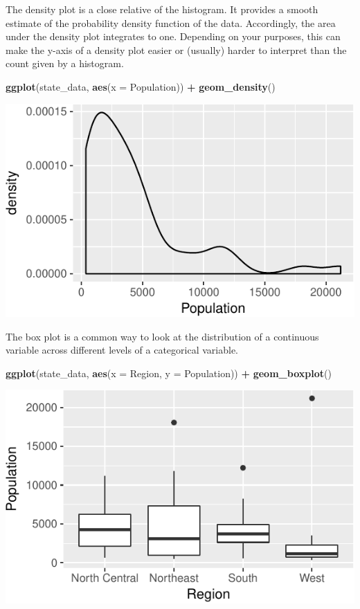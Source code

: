 \documentclass[
  12pt,
  oneside,openany]{book}
\newenvironment{Shaded}{\begin{snugshade}}{\end{snugshade}}
\newcommand{\DataTypeTok}[1]{\textcolor[rgb]{0.13,0.29,0.53}{#1}}
\newcommand{\KeywordTok}[1]{\textcolor[rgb]{0.13,0.29,0.53}{\textbf{#1}}}
\newcommand{\NormalTok}[1]{#1}
\newcommand{\OperatorTok}[1]{\textcolor[rgb]{0.81,0.36,0.00}{\textbf{#1}}}
\newcommand{\StringTok}[1]{\textcolor[rgb]{0.31,0.60,0.02}{#1}}
\begin{document}
The density plot is a close relative of the histogram. It provides a smooth estimate of the probability density function of the data. Accordingly, the area under the density plot integrates to one. Depending on your purposes, this can make the y-axis of a density plot easier or (usually) harder to interpret than the count given by a histogram.

\begin{Shaded}
\begin{Highlighting}[]
\KeywordTok{ggplot}\NormalTok{(state\_data, }\KeywordTok{aes}\NormalTok{(}\DataTypeTok{x =}\NormalTok{ Population)) }\OperatorTok{+}
\StringTok{  }\KeywordTok{geom\_density}\NormalTok{()}
\end{Highlighting}
\end{Shaded}

\includegraphics{pdaps_files/figure-latex/density-1.pdf}

The box plot is a common way to look at the distribution of a continuous variable across different levels of a categorical variable.

\begin{Shaded}
\begin{Highlighting}[]
\KeywordTok{ggplot}\NormalTok{(state\_data, }\KeywordTok{aes}\NormalTok{(}\DataTypeTok{x =}\NormalTok{ Region, }\DataTypeTok{y =}\NormalTok{ Population)) }\OperatorTok{+}
\StringTok{  }\KeywordTok{geom\_boxplot}\NormalTok{()}
\end{Highlighting}
\end{Shaded}

\includegraphics{pdaps_files/figure-latex/boxplot-1.pdf}
\end{document}
